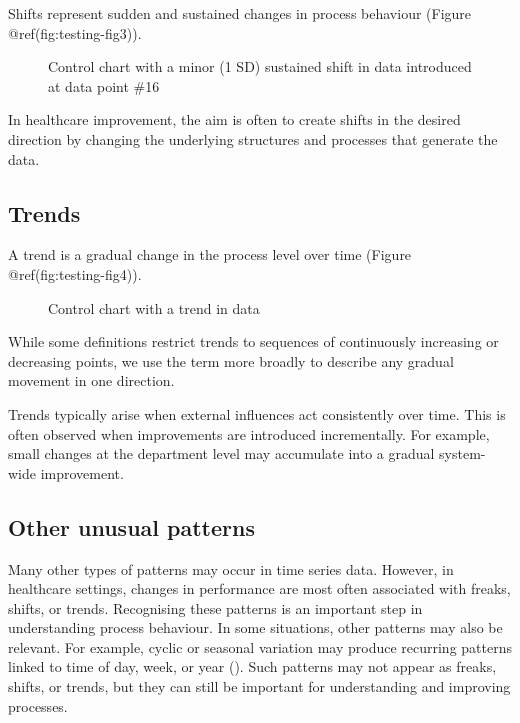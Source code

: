 \documentclass[
]{book}
\makeatletter
\newcommand*\pandocbounded[1]{%
  \sbox\pandoc@box{#1}%
  \Gscale@div\@tempa{\textheight}{\dimexpr\ht\pandoc@box+\dp\pandoc@box\relax}%
  \Gscale@div\@tempb{\linewidth}{\wd\pandoc@box}%
  \ifdim\@tempb\p@<\@tempa\p@\let\@tempa\@tempb\fi%
  \ifdim\@tempa\p@<\p@\scalebox{\@tempa}{\usebox\pandoc@box}%
  \else\usebox{\pandoc@box}%
  \fi%
}
\makeatother
\begin{document}
Shifts represent sudden and sustained changes in process behaviour
(Figure @ref(fig:testing-fig3)).

\begin{figure}
\centering
\pandocbounded{}
\caption{Control chart with a minor (1 SD) sustained shift in data
introduced at data point \#16}
\end{figure}

In healthcare improvement, the aim is often to create shifts in the
desired direction by changing the underlying structures and processes
that generate the data.

\subsection{Trends}\label{trends}

A trend is a gradual change in the process level over time (Figure
@ref(fig:testing-fig4)).

\begin{figure}
\centering
\pandocbounded{}
\caption{Control chart with a trend in data}
\end{figure}

While some definitions restrict trends to sequences of continuously
increasing or decreasing points, we use the term more broadly to
describe any gradual movement in one direction.

Trends typically arise when external influences act consistently over
time. This is often observed when improvements are introduced
incrementally. For example, small changes at the department level may
accumulate into a gradual system-wide improvement.

\subsection{Other unusual patterns}\label{other-unusual-patterns}

Many other types of patterns may occur in time series data. However, in
healthcare settings, changes in performance are most often associated
with freaks, shifts, or trends. Recognising these patterns is an
important step in understanding process behaviour. In some situations,
other patterns may also be relevant. For example, cyclic or seasonal
variation may produce recurring patterns linked to time of day, week, or
year (). Such
patterns may not appear as freaks, shifts, or trends, but they can still
be important for understanding and improving processes.
\end{document}
